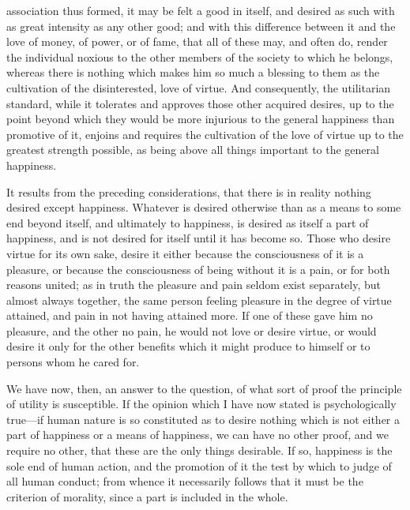 \documentclass[12pt]{report}
\begin{document}
association thus formed, it may be felt a good in itself, and desired as such with as great intensity as any other good; and with this difference between it and the love of money, of power, or of fame, that all of these may, and often do, render the individual noxious to the other members of the society to which he belongs, whereas there is nothing which makes him so much a blessing to them as the cultivation of the disinterested, love of virtue. And consequently, the utilitarian standard, while it tolerates and approves those other acquired desires, up to the point beyond which they would be more injurious to the general happiness than promotive of it, enjoins and requires the cultivation of the love of virtue up to the greatest strength possible, as being above all things important to the general happiness.

It results from the preceding considerations, that there is in reality nothing desired except happiness. Whatever is desired otherwise than as a means to some end beyond itself, and ultimately to happiness, is desired as itself a part of happiness, and is not desired for itself until it has become so. Those who desire virtue for its own sake, desire it either because the consciousness of it is a pleasure, or because the consciousness of being without it is a pain, or for both reasons united; as in truth the pleasure and pain seldom exist separately, but almost always together, the same person feeling pleasure in the degree of virtue attained, and pain in not having attained more. If one of these gave him no pleasure, and the other no pain, he would not love or desire virtue, or would desire it only for the other benefits which it might produce to himself or to persons whom he cared for.

We have now, then, an answer to the question, of what sort of proof the principle of utility is susceptible. If the opinion which I have now stated is psychologically true—if human nature is so constituted as to desire nothing which is not either a part of happiness or a means of happiness, we can have no other proof, and we require no other, that these are the only things desirable. If so, happiness is the sole end of human action, and the promotion of it the test by which to judge of all human conduct; from whence it necessarily follows that it must be the criterion of morality, since a part is included in the whole.
\end{document}
